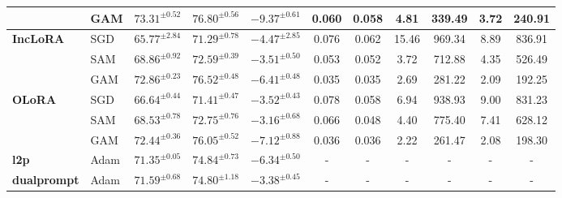 \documentclass{article}
\theoremstyle{plain}
\theoremstyle{definition}
\theoremstyle{remark}
\begin{document}
\begin{table}[htpb]
{\begin{tabular}{l l ccc ccccc c}
 &GAM  &$73.31^{\pm 0.52}$ & $76.80^{\pm 0.56}$ & $-9.37^{\pm 0.61}$ & 0.060  &0.058  & 4.81    & 339.49   & 3.72   & 240.91   \\
\midrule
\multirow{2}{*}{\textbf{IncLoRA}}
& SGD    &$65.77^{\pm 2.84}$ & $71.29^{\pm 0.78}$ & $-4.47^{\pm 2.85}$ & 0.076    & 0.062 & 15.46 & 969.34  & 8.89  & 836.91 \\
& SAM    &$68.86^{\pm 0.92}$ & $72.59^{\pm 0.39}$ & $-3.51^{\pm 0.50}$ & 0.053   & 0.052 & 3.72    & 712.88   & 4.35   & 526.49   \\
 &GAM  &$72.86^{\pm 0.23}$ & $76.52^{\pm 0.48}$ & $-6.41^{\pm 0.48}$ & 0.035   & 0.035 & 2.69    & 281.22   & 2.09   & 192.25   \\
\midrule
\multirow{2}{*}{\textbf{OLoRA}}
& SGD    &$66.64^{\pm 0.44}$ & $71.41^{\pm 0.47}$ & $-3.52^{\pm 0.43}$ & 0.078   & 0.058 & 6.94    & 938.93   & 9.00   & 831.23   \\
& SAM    &$68.53^{\pm 0.78}$ & $72.75^{\pm 0.76}$ & $-3.16^{\pm 0.68}$ & 0.066   & 0.048 & 4.40    & 775.40   & 7.41   & 628.12   \\
 &GAM &$72.44^{\pm 0.36}$ & $76.05^{\pm 0.52}$ & $-7.12^{\pm 0.88}$ & 0.036   & 0.036 & 2.22    & 261.47   & 2.08   & 198.30\\
\midrule
\multirow{1}{*}{\textbf{l2p}}
& Adam   & $71.35^{\pm 0.05}$ & $74.84^{\pm 0.73}$ & $-6.34^{\pm 0.50}$  &-  &- &- &- &- &- \\
\midrule
\multirow{1}{*}{\textbf{dualprompt}}
& Adam   & $71.59^{\pm 0.68}$ & $74.80^{\pm 1.18}$ & $-3.38^{\pm 0.45}$ &-  &- &- &- &- &- \\
\bottomrule
\end{tabular}
}
\end{table}
\end{document}
